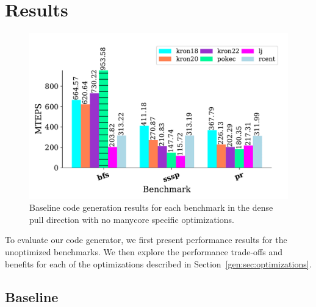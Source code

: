 \section{Results}
\begin{figure}[h]
    \centering
    \includegraphics[scale = 0.6]{graphit-figures/baseline.pdf}
    \caption{Baseline code generation results for each benchmark in the dense pull direction with no manycore specific optimizations.}
    \label{pap:generals:sec:eval:fig:baseline}
\end{figure}

To evaluate our code generator, we first present performance results for the unoptimized benchmarks. 
We then explore the performance trade-offs and benefits for each of the optimizations described in Section~\ref{gen:sec:optimizations}.

\subsection{Baseline}
 
